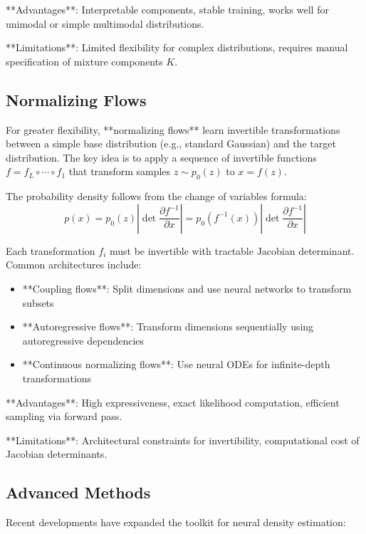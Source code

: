 \documentclass[11pt,a4paper]{article}
\theoremstyle{definition}
\begin{document}
**Advantages**: Interpretable components, stable training, works well for unimodal or simple multimodal distributions.

**Limitations**: Limited flexibility for complex distributions, requires manual specification of mixture components $K$.

\subsection{Normalizing Flows}

For greater flexibility, **normalizing flows** learn invertible transformations between a simple base distribution (e.g., standard Gaussian) and the target distribution. The key idea is to apply a sequence of invertible functions $f = f_L \circ \cdots \circ f_1$ that transform samples $z \sim p_0(z)$ to $x = f(z)$.

The probability density follows from the change of variables formula:
\begin{equation}
    p(x) = p_0(z) \left| \det \frac{\partial f^{-1}}{\partial x} \right| = p_0(f^{-1}(x)) \left| \det \frac{\partial f^{-1}}{\partial x} \right|
\end{equation}

Each transformation $f_i$ must be invertible with tractable Jacobian determinant. Common architectures include:
\begin{itemize}
    \item **Coupling flows**: Split dimensions and use neural networks to transform subsets
    \item **Autoregressive flows**: Transform dimensions sequentially using autoregressive dependencies
    \item **Continuous normalizing flows**: Use neural ODEs for infinite-depth transformations
\end{itemize}

**Advantages**: High expressiveness, exact likelihood computation, efficient sampling via forward pass.

**Limitations**: Architectural constraints for invertibility, computational cost of Jacobian determinants.

\subsection{Advanced Methods}

Recent developments have expanded the toolkit for neural density estimation:
\end{document}
